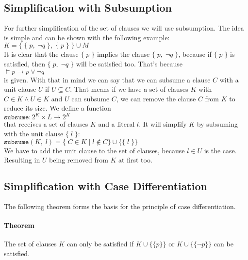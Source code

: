 \subsection{Simplification with Subsumption}
\label{sub:sciDavisPutnamSubsumption}
For further simplification of the set of clauses we will use subsumption. The idea is simple and can be shown with the following example:
\\
\hspace*{1.3cm} $K = \{\; \{\; p,\; \neg q \;\},\; \{\; p\; \}\; \} \cup M$
\\[0.2cm]
It is clear that the clause $\{\; p\; \}$ implies the clause $\{\; p,\; \neg q \;\}$, because if $\{\; p\; \}$ is satisfied, then $\{\; p,\; \neg q \;\}$ will be satisfied too. That's because
\\
\hspace*{1.3cm} $\models p \to p \lor \neg q$
\\[0.2cm]
is given. With that in mind we can say that we can subsume a clause $C$ with a unit clause $U$ if $U \subseteq C$. That means if we have a set of clauses $K$ with $C \in K \land U \in K$ and $U$ can subsume $C$, we can remove the clause $C$ from $K$ to reduce its size. We define a function
\\
\hspace*{1.3cm} $\texttt{subsume}: 2^{K} \times L \to 2^{K}$
\\[0.2cm]
that receives a set of clauses $K$ and a literal $l$. It will simplify $K$ by subsuming with the unit clause $\{\; l\; \}$:
\\
\hspace*{1.3cm} $\texttt{subsume}(K,\; l) = \{\; C \in K\; |\; l \notin C\} \cup \{\{\; l\; \}\}$
\\[0.2cm]
We have to add the unit clause to the set of clauses, because $l \in U$ is the case. Resulting in $U$ being removed from $K$ at first too. \cite{Stroetman2019}

\subsection{Simplification with Case Differentiation}
\label{sub:sciDavisPutnamCaseDiv}
The following theorem forms the basis for the principle of case differentiation.

\paragraph{Theorem}
The set of clauses $K$ can only be satisfied if $K \cup \bigl\{\{p\}\bigr\}$ or $K \cup \bigl\{\{\neg p\}\bigr\}$ can be satisfied.

